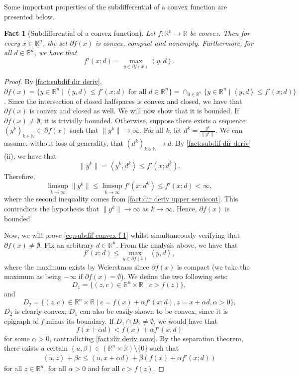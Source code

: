 \documentclass[smallextended,numbook,nospthms]{svjour3}
\theoremstyle{plain}
\newtheorem{fact}[theorem]{Fact}
\theoremstyle{definition}
\def\RR{\mathds R}
\def\NN{\mathds N}
\newcommand{\scal}[2]{\left\langle{#1},{#2}  \right\rangle}
\begin{document}
Some important properties of the subdifferential of a convex function are presented below.
\begin{fact}[Subdifferential of a convex function]\label{fact:subdif convex f}
	Let $f: \RR^n \rightarrow \RR$ be convex. Then for every $x \in \RR^n$, the set $\partial f(x)$ is convex, compact and nonempty. Furthermore, for all $d \in \RR^n$, we have that
	\[
	f'(x;d)=\max_{y \in \partial f(x)} \scal{y}{d}. \label{eq:subdif convex f 1}
	\]
\end{fact}
\begin{proof}
	By \cref{fact:subdif dir deriv}, $\partial f(x) = \{y \in \RR^n \mid \scal{y}{d} \leq f'(x;d) \text{ for all } d \in \RR^n \}=\cap_{d \in \RR^n}\{y \in \RR^n \mid \scal{y}{d} \leq f'(x;d)\}$. Since the intersection of closed halfspaces is convex and closed, we have that $\partial f(x)$ is convex and closed as well.	We will now show that it is bounded.
	If $\partial f(x) \not= \emptyset$, it is trivially bounded. Otherwise, suppose there exists a sequence $(y^k)_{k \in \NN} \subset \partial f(x)$ such that $\| y^k \| \rightarrow \infty$. For all $k$, let $d^k=\frac{y^k}{\| y^k\|}$. We can assume, without loss of generality, that $(d^k)_{k \in \NN} \rightarrow d$. By \cref{fact:subdif dir deriv}(ii), we have that
	\[
	\|y^k\| = \scal{y^k}{d^k} \leq f'(x;d^k).
	\]
	Therefore,
	\[
	\limsup_{k \rightarrow \infty} \|y^k\| \leq \limsup_{k \rightarrow \infty} f'(x;d^k) \leq f'(x;d) < \infty,
	\]
	where the second inequality comes from \cref{fact:dir deriv upper semicont}. This contradicts the hypothesis that $\|y^k\| \rightarrow \infty$ as $k\rightarrow \infty$. Hence, $\partial f(x)$ is bounded.
	
	Now, we will prove \cref{eq:subdif convex f 1} whilst simultaneously verifying that $\partial f(x) \not= \emptyset$. Fix an arbitrary $d \in \RR^n$. From the analysis above, we have that
	\[
	f'(x;d) \leq \max_{y \in \partial f(x)}\scal{y}{d} \label{eq:subdif convex f 2},
	\]
	where the maximum exists by Weierstrass since $\partial f(x)$ is compact (we take the maximum as being $-\infty$ if $\partial f(x)=\emptyset$). We define the two following sets:
	\[
	D_1=\{(z,c) \in \RR^n \times \RR \mid c > f(z)\},
	\]
	and
	\[
	D_2=\{(z,c) \in \RR^n \times \RR \mid c=f(x)+\alpha f'(x;d), z=x+\alpha d, \alpha>0\}.
	\]
	$D_2$ is clearly convex; $D_1$ can also be easily shown to be convex, since it is epigraph of $f$ minus its boundary.
	If $D_1 \cap D_2 \not= \emptyset$, we would have that
	\[
	f(x +\alpha d) < f(x) + \alpha f'(x;d)
	\]
	for some $\alpha > 0$, contradicting \cref{fact:dir deriv conv}.
	By the separation theorem, there exists a certain $(u,\beta) \in (\RR^n \times \RR ) \setminus \{0\}$ such that
	\begin{align}
		\scal{u}{z} + \beta c \leq \scal{u}{x + \alpha d} + \beta(f(x)+\alpha f'(x;d)) \label{eq:subdif convex f 3}
	\end{align}
	for all $z \in \RR^n$, for all $\alpha > 0$ and for all $c > f(z)$.


\end{proof}
\end{document}
